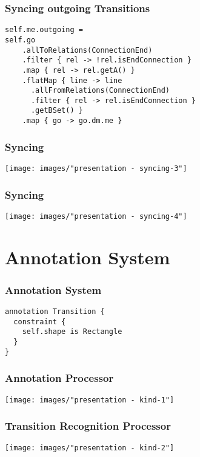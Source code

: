 \begin{frame}[fragile]
  \frametitle{Syncing outgoing Transitions}
  \vspace*{-1cm}
  \begin{lstlisting}
self.me.outgoing = 
self.go
    .allToRelations(ConnectionEnd)
    .filter { rel -> !rel.isEndConnection }
    .map { rel -> rel.getA() }
    .flatMap { line -> line
      .allFromRelations(ConnectionEnd)
      .filter { rel -> rel.isEndConnection }
      .getBSet() }
    .map { go -> go.dm.me }
  \end{lstlisting}
\end{frame}

\begin{frame}
  \frametitle{Syncing}
  \hspace{-1cm}
  \texttt{[image: images/"presentation - syncing-3"]}
\end{frame}

\begin{frame}
  \frametitle{Syncing}
  \hspace{-1cm}
  \texttt{[image: images/"presentation - syncing-4"]}
\end{frame}


\section{Annotation System}
\begin{frame}
  \centering
  \hspace{-1cm}
  \huge
\end{frame}

\begin{frame}[fragile]
  \frametitle{Annotation System}
  \vspace*{-1cm}
  \begin{lstlisting}
annotation Transition {
  constraint {
    self.shape is Rectangle
  }
}
  \end{lstlisting}
\end{frame}


\begin{frame}
  \frametitle{Annotation Processor}
  \hspace{-1cm}
  \texttt{[image: images/"presentation - kind-1"]}
\end{frame}

\begin{frame}
  \frametitle{Transition Recognition Processor}
  \hspace{-1cm}
  \texttt{[image: images/"presentation - kind-2"]}
\end{frame}


